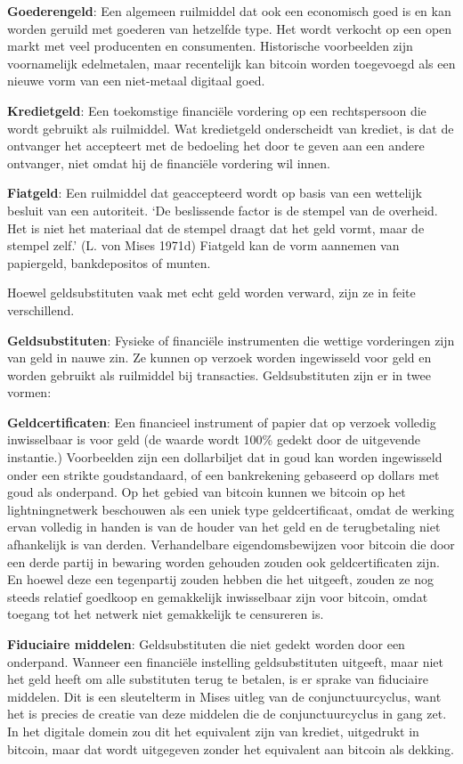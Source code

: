 \documentclass[
  a5paper,
  smalldemyvopaper,11pt,twoside,onecolumn,openright,extrafontsizes,
hidelinks]{memoir}
\begin{document}
\textbf{Goederengeld}: Een algemeen ruilmiddel dat ook een economisch
goed is en kan worden geruild met goederen van hetzelfde type. Het wordt
verkocht op een open markt met veel producenten en consumenten.
Historische voorbeelden zijn voornamelijk edelmetalen, maar recentelijk
kan bitcoin worden toegevoegd als een nieuwe vorm van een niet-metaal
digitaal goed.

\textbf{Kredietgeld}: Een toekomstige financiële vordering op een
rechtspersoon die wordt gebruikt als ruilmiddel. Wat kredietgeld
onderscheidt van krediet, is dat de ontvanger het accepteert met de
bedoeling het door te geven aan een andere ontvanger, niet omdat hij de
financiële vordering wil innen.

\textbf{Fiatgeld}: Een ruilmiddel dat geaccepteerd wordt op basis van
een wettelijk besluit van een autoriteit. `De beslissende factor is de
stempel van de overheid. Het is niet het materiaal dat de stempel draagt
dat het geld vormt, maar de stempel zelf.' (L. von Mises 1971d) Fiatgeld
kan de vorm aannemen van papiergeld, bankdepositos of munten.

Hoewel geldsubstituten vaak met echt geld worden verward, zijn ze in
feite verschillend.

\textbf{Geldsubstituten}: Fysieke of financiële instrumenten die wettige
vorderingen zijn van geld in nauwe zin. Ze kunnen op verzoek worden
ingewisseld voor geld en worden gebruikt als ruilmiddel bij transacties.
Geldsubstituten zijn er in twee vormen:

\textbf{Geldcertificaten}: Een financieel instrument of papier dat op
verzoek volledig inwisselbaar is voor geld (de waarde wordt 100\% gedekt
door de uitgevende instantie.) Voorbeelden zijn een dollarbiljet dat in
goud kan worden ingewisseld onder een strikte goudstandaard, of een
bankrekening gebaseerd op dollars met goud als onderpand. Op het gebied
van bitcoin kunnen we bitcoin op het lightningnetwerk beschouwen als een
uniek type geldcertificaat, omdat de werking ervan volledig in handen is
van de houder van het geld en de terugbetaling niet afhankelijk is van
derden. Verhandelbare eigendomsbewijzen voor bitcoin die door een derde
partij in bewaring worden gehouden zouden ook geldcertificaten zijn. En
hoewel deze een tegenpartij zouden hebben die het uitgeeft, zouden ze
nog steeds relatief goedkoop en gemakkelijk inwisselbaar zijn voor
bitcoin, omdat toegang tot het netwerk niet gemakkelijk te censureren
is.

\textbf{Fiduciaire middelen}: Geldsubstituten die niet gedekt worden
door een onderpand. Wanneer een financiële instelling geldsubstituten
uitgeeft, maar niet het geld heeft om alle substituten terug te betalen,
is er sprake van fiduciaire middelen. Dit is een sleutelterm in Mises
uitleg van de conjunctuurcyclus, want het is precies de creatie van deze
middelen die de conjunctuurcyclus in gang zet. In het digitale domein
zou dit het equivalent zijn van krediet, uitgedrukt in bitcoin, maar dat
wordt uitgegeven zonder het equivalent aan bitcoin als dekking.
\end{document}
